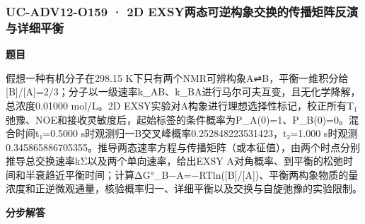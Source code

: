 \documentclass[UTF8,11pt,a4paper]{ctexart}
\begin{document}
\subsubsection*{UC-ADV12-O159 · 2D EXSY两态可逆构象交换的传播矩阵反演与详细平衡}
\noindent\textbf{题目}\par
假想一种有机分子在298.15 K下只有两个NMR可辨构象A⇌B，平衡一维积分给[B]/[A]=2/3；分子以一级速率k\_AB、k\_BA进行马尔可夫互变，且无化学降解，总浓度0.01000 mol/L。2D EXSY实验对A构象进行理想选择性标记，校正所有T₁弛豫、NOE和接收灵敏度后，起始标签的条件概率为P\_A(0)=1、P\_B(0)=0。混合时间t₁=0.5000 s时观测归一B交叉峰概率0.252848223531423，t₂=1.000 s时观测0.345865886705355。推导两态速率方程与传播矩阵（或本征值），由两个时点分别推导总交换速率kΣ以及两个单向速率，给出EXSY A对角概率、到平衡的松弛时间和半衰趋近平衡时间；计算ΔG°\_B−A=−RTln([B]/[A])、平衡两构象物质的量浓度和正逆微观通量，核验概率归一、详细平衡以及交换与自旋弛豫的实验限制。\par
\medskip\noindent\textbf{分步解答}
\end{document}
